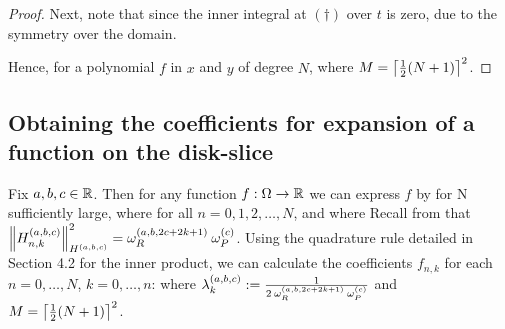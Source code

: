 \begin{proof}
Next, note that 
since the inner integral at $(\dagger)$ over $t$ is zero, due to the symmetry over the domain.

Hence, for a polynomial $f$ in $x$ and $y$ of degree $N$,
where $M = \left\lceil\frac{1}{2}(N+1)\right\rceil^2$.
\end{proof}

\subsection{Obtaining the coefficients for expansion of a function on the disk-slice}

Fix $a,b,c \in \mathbb{R}$. Then for any function $f : \Omega \to \mathbb{R}$ we can express $f$ by
for N sufficiently large, where
for all $n = 0,1,2,\dots,N$, and where
Recall from  that $\left\| H_{n,k}^{(a,b,c)} \right\|^2_{H^{(a,b,c)}} = \omega_R^{(a,b,2c+2k+1)} \: \omega_P^{(c)}$. Using the quadrature rule detailed in Section 4.2 for the inner product, we can calculate the coefficients $f_{n,k}$ for each $n = 0,\dots,N$, $k = 0,\dots,n$: 
where $\lambda^{(a,b,c)}_k := {1 \over 2 \: \omega_R^{(a,b,2c+2k+1)} \: \omega_P^{(c)}}$ and $M = \left\lceil\frac{1}{2}(N+1)\right\rceil^2$.


